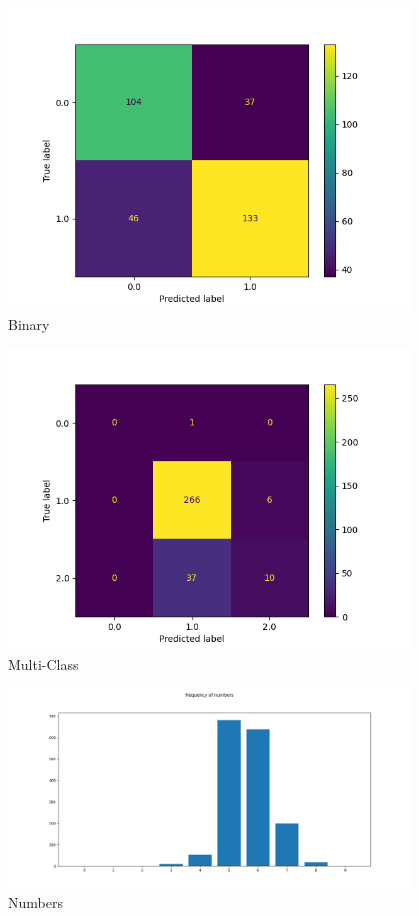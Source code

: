 \documentclass[11pt,a4paper]{scrartcl}
\begin{document}
\begin{figure}
	\centering
	\includegraphics[width=0.95\textwidth]{conMatBinary.png}
	\caption{Binary}
	\label{fig:logo}
\end{figure}
\begin{figure}
	\centering
	\includegraphics[width=0.95\textwidth]{conMatMulti.png}
	\caption{Multi-Class}
	\label{fig:logo}
\end{figure}	 
\begin{figure}
	\centering
	\includegraphics[width=0.95\textwidth]{freqNum.png}
	\caption{Numbers}
	\label{fig:logo}
\end{figure}
\end{document}
